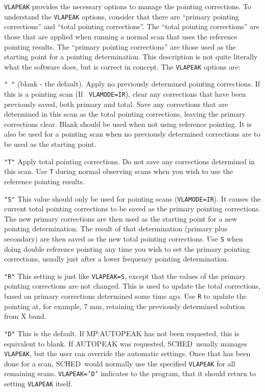 \documentclass{report}
\newcommand{\schedb}{{\sc SCHED~}}
\begin{document}
{\tt VLAPEAK} provides the necessary options to manage the pointing
corrections.  To understand the {\tt VLAPEAK} options, consider that
there are ``primary pointing corrections'' and ``total pointing
corrections''.  The ``total pointing corrections'' are those that are
applied when running a normal scan that uses the reference pointing
results.  The ``primary pointing corrections'' are those used as the
starting point for a pointing determination.  This description is not
quite literally what the software does, but is correct in concept.
The {\tt VLAPEAK} options are:

\begin{description}

\item {\tt " "} (blank - the default).  Apply no previously determined
pointing corrections.  If this is a pointing scan (If {\tt
VLAMODE=IR}), clear any corrections that have been previously saved,
both primary and total.  Save any corrections that are determined in
this scan as the total pointing corrections, leaving the primary
corrections clear.  Blank should be used when not using
reference pointing.  It is also be used for a pointing scan
when no previously determined corrections are to be used as the
starting point.

\item {\tt "T"} Apply total pointing corrections.  Do not save any
corrections determined in this scan.  Use {\tt T} during
normal observing scans when you wish to use the reference pointing
results.

\item {\tt "S"} This value should only be used for pointing scans
({\tt VLAMODE=IR}).  It causes the current total pointing corrections
to be saved as the primary pointing corrections.  The new primary
corrections are then used as the starting point for a new pointing
determination.  The result of that determination (primary plus
secondary) are then saved as the new total pointing corrections.  Use
{\tt S} when doing double reference pointing any time you wish to
set the primary pointing corrections, usually just after a lower
frequency pointing determination.

\item {\tt "R"} This setting is just like {\tt VLAPEAK=S}, except that
the values of the primary pointing corrections are not changed.  This
is used to update the total corrections, based on primary corrections
determined some time ago.  Use {\tt R} to update the pointing at,
for example, 7 mm, retaining the previously determined solution from X
band.

\item{\tt "D"} This is the default.  If 
{MP:AUTOPEAK} has not been requested, this is equivalent to blank.
If AUTOPEAK was requested, \schedb usually manages {\tt VLAPEAK}, but
the user can override the automatic settings.  Once that has been
done for a scan, \schedb would normally use the specified {\tt VLAPEAK}
for all remaining scans.  {\tt VLAPEAK='D'} indicates to the program,
that it should return to setting {\tt VLAPEAK} itself.

\end{description}
\end{document}
